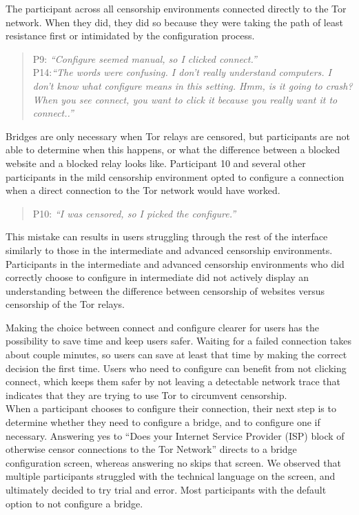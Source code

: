 \documentclass{template}
\begin{document}
The participant across all censorship environments connected directly to the Tor network. When they did, they did so because they were taking the path of least resistance first or intimidated by the configuration process. 
\begin{quotation}
\noindent P9: \textit{``Configure seemed manual, so I clicked connect.''}\\

\noindent P14:\textit{``The words were confusing. I don't really understand computers. I don't know what configure means in this setting. Hmm, is it going to crash? When you see connect, you want to click it because you really want it to connect..''} 
\end{quotation}

Bridges are only necessary when Tor relays are censored, but participants are not able to determine when this happens, or what the difference between a blocked website and a blocked relay looks like. Participant 10 and several other participants in the mild censorship environment opted to configure a connection when a direct connection to the Tor network would have worked. 

\begin{quotation}
\noindent P10: \textit{``I was censored, so I picked the configure.''}
\end{quotation}

This mistake can results in users struggling through the rest of the interface similarly to those in the intermediate and advanced censorship environments. Participants in the intermediate and advanced censorship environments who did correctly choose to configure in intermediate did not actively display an understanding between the difference between censorship of websites versus censorship of the Tor relays. 

Making the choice between connect and configure clearer for users has the possibility to save time and keep users safer. Waiting for a failed connection takes about couple minutes, so users can save at least that time by making the correct decision the first time. Users who need to configure can benefit from not clicking connect, which keeps them safer by not leaving a detectable network trace that indicates that they are trying to use Tor to circumvent censorship.\\

When a participant chooses to configure their connection, their next step is to determine whether they need to configure a bridge, and to configure one if necessary. Answering yes to ``Does your Internet Service Provider (ISP) block of otherwise censor connections to the Tor Network'' directs to a bridge configuration screen, whereas answering no skips that screen. We observed that multiple participants struggled with the technical language on the screen, and ultimately decided to try trial and error. Most participants with the default option to not configure a bridge. 
\end{document}
